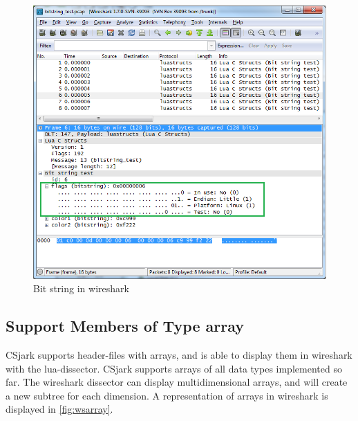\begin{figure}[ht]
	\center
	\includegraphics[width=\textwidth]{./sprints/img/wireshark_bitstring}
	\caption{Bit string in \Gls{wireshark}\label{fig:wsbitstring}}
\end{figure}



\subsection{Support Members of Type \Gls{array}}
CSjark supports \gls{header}-files with \glspl{array}, and is able to display them in 
\Gls{wireshark} with the \Gls{lua}-\gls{dissector}. CSjark supports \glspl{array} of all data types 
implemented so far. The \Gls{wireshark} \gls{dissector} can display multidimensional 
\glspl{array}, and will create a new subtree for each dimension.  A representation of 
\glspl{array} in \Gls{wireshark} is displayed in \autoref{fig:wsarray}.

